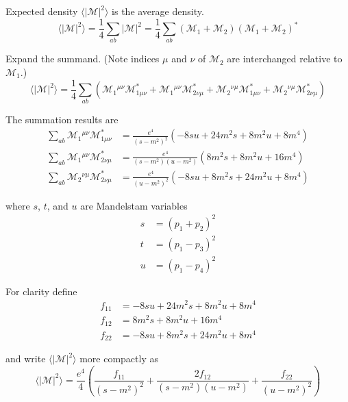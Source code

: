 Expected density $\langle|\mathcal M|^2\rangle$ is the average density.
\begin{equation*}
\langle|\mathcal M|^2\rangle
=\frac{1}{4}\sum_{ab}|\mathcal M|^2
=\frac{1}{4}\sum_{ab}(\mathcal M_1+\mathcal M_2)(\mathcal M_1+\mathcal M_2)^*
\end{equation*}

Expand the summand.
(Note indices $\mu$ and $\nu$ of $\mathcal M_2$ are interchanged relative to $\mathcal M_1$.)
\begin{equation*}
\langle|\mathcal{M}|^2\rangle
=\frac{1}{4}\sum_{ab}
\left(
\mathcal M_{1}{}^{\mu\nu}\mathcal M^*_{1\mu\nu}
+\mathcal M_{1}{}^{\mu\nu}\mathcal M^*_{2\nu\mu}
+\mathcal M_{2}{}^{\nu\mu}\mathcal M^*_{1\mu\nu}
+\mathcal M_{2}{}^{\nu\mu}\mathcal M^*_{2\nu\mu}
\right)
\end{equation*}

The summation results are
\begin{align*}
\sum_{ab}\mathcal M_{1}{}^{\mu\nu}\mathcal M^*_{1\mu\nu}
&=\frac{e^4}{(s-m^2)^2}
\left(-8 s u + 24 m^2 s + 8 m^2 u + 8 m^4\right)
\\
\sum_{ab}\mathcal M_{1}{}^{\mu\nu}\mathcal M^*_{2\nu\mu}
&=\frac{e^4}{(s-m^2)(u-m^2)}
\left(8 m^2 s + 8 m^2 u + 16 m^4\right)
\\
\sum_{ab}\mathcal M_{2}{}^{\nu\mu}\mathcal M^*_{2\nu\mu}
&=\frac{e^4}{(u-m^2)^2}
\left(-8 s u + 8 m^2 s + 24 m^2 u + 8 m^4\right)
\end{align*}

where $s$, $t$, and $u$ are Mandelstam variables
\begin{align*}
s&=(p_1+p_2)^2
\\
t&=(p_1-p_3)^2
\\
u&=(p_1-p_4)^2
\end{align*}

For clarity define
\begin{align*}
f_{11}&=-8 s u + 24 m^2 s + 8 m^2 u + 8 m^4
\\
f_{12}&=8 m^2 s + 8 m^2 u + 16 m^4
\\
f_{22}&=-8 s u + 8 m^2 s + 24 m^2 u + 8 m^4
\end{align*}

and write $\langle|\mathcal{M}|^2\rangle$ more compactly as
\begin{equation*}
\langle|\mathcal{M}|^2\rangle=\frac{e^4}{4}
\left(\frac{f_{11}}{(s-m^2)^2}+\frac{2f_{12}}{(s-m^2)(u-m^2)}+\frac{f_{22}}{(u-m^2)^2}\right)
\end{equation*}

